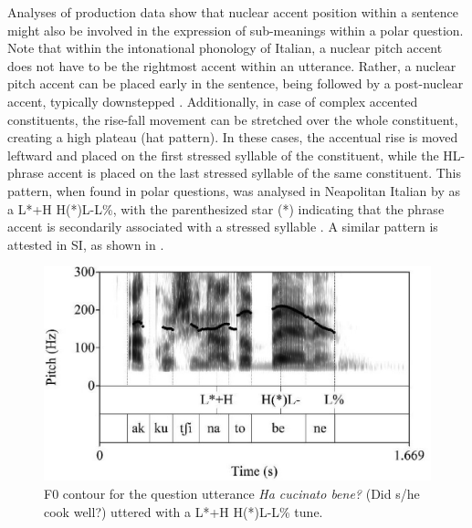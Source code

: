 \documentclass[output=paper,colorlinks,citecolor=brown]{langscibook}
\begin{document}
Analyses of production data show that nuclear accent position within a sentence might also be involved in the expression of sub-meanings within a polar question. Note that within the intonational phonology of Italian, a nuclear pitch accent does not have to be the rightmost accent within an utterance. Rather, a nuclear pitch accent can be placed early in the sentence, being followed by a post-nuclear accent, typically downstepped \citep{griceetal2005, dImperioetal2020}. Additionally, in case of complex accented constituents, the rise-fall movement can be stretched over the whole constituent, creating a high plateau (hat pattern). In these cases, the accentual rise is moved leftward and placed on the first stressed syllable of the constituent, while the HL- phrase accent is placed on the last stressed syllable of the same constituent. This pattern, when found in polar questions, was analysed in Neapolitan Italian by \citet{dimperio2002} as a L*+H H(*)L-L\%, with the parenthesized star (*) indicating that the phrase accent is secondarily associated with a stressed syllable \citep[see also][]{prietoetal2005}. A similar pattern is attested in SI, as shown in .

\begin{figure}
\includegraphics[scale=1]{figures/ch10-2.jpg}
\caption{F0 contour for the question utterance \textit{Ha cucinato bene?} (Did s/he cook well?) uttered with a L*+H H(*)L-L\% tune.}
\label{fig2}
\end{figure}
\end{document}
